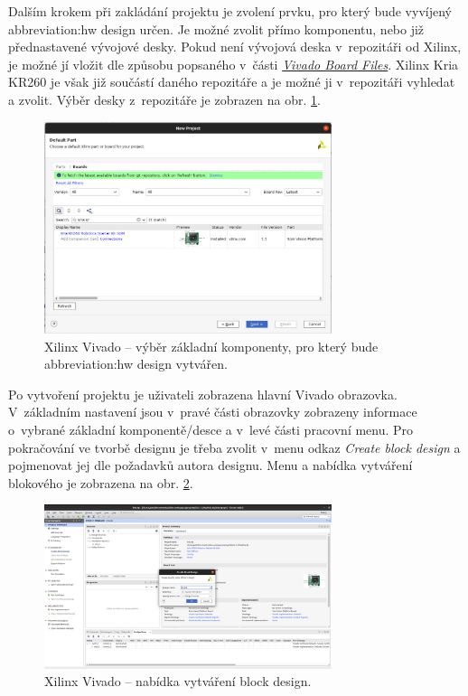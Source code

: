 \documentclass[a4paper, twoside, 11pt]{article}
\begin{document}
				Dalším krokem při zakládání projektu je zvolení prvku, pro který bude vyvíjený \gls{abbreviation:hw} design určen. Je možné zvolit přímo komponentu, nebo již přednastavené vývojové desky. Pokud není vývojová deska v~repozitáři od Xilinx, je možné jí vložit dle způsobu popsaného v~části \hyperref[subsec:vivado-board-files]{\textit{Vivado Board Files}}. Xilinx Kria KR260 je však již součástí daného repozitáře a je možné ji v~repozitáři vyhledat a zvolit. Výběr desky z~repozitáře je zobrazen na obr. \ref{fig:kr26-xilix-vivado-flow-02}.

				\begin{figure}[htbp!]
					\centering
					\includegraphics[width=0.75\textwidth]{src/png/kr26-xilinx-vivado-flow/kr26-xilix-vivado-flow-02.jpg}
					\caption{Xilinx Vivado – výběr základní komponenty, pro který bude \gls{abbreviation:hw} design vytvářen.}
					\label{fig:kr26-xilix-vivado-flow-02}
				\end{figure}

				Po vytvoření projektu je uživateli zobrazena hlavní Vivado obrazovka. V~základním nastavení jsou v~pravé části obrazovky zobrazeny informace o~vybrané základní komponentě/desce a v~levé části pracovní menu. Pro pokračování ve tvorbě designu je třeba zvolit v~menu odkaz \textit{Create block design} a pojmenovat jej dle požadavků autora designu. Menu a nabídka vytváření blokového je zobrazena na obr. \ref{fig:kr26-xilix-vivado-flow-03}.
		
				\begin{figure}[htbp!]
					\centering
					\includegraphics[width=0.75\textwidth]{src/png/kr26-xilinx-vivado-flow/kr26-xilix-vivado-flow-03.jpg}
					\caption{Xilinx Vivado – nabídka vytváření block design.}
					\label{fig:kr26-xilix-vivado-flow-03}
				\end{figure}
\end{document}
